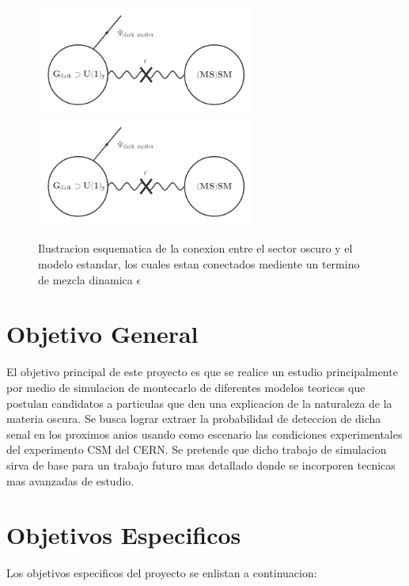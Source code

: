 \begin{figure}
\begin{center}
  \includegraphics[width=2.8in]{sketch_darksector.png}
  \includegraphics[width=2.8in]{sketch_darksector.png}
  \caption{Ilustracion esquematica de la conexion entre el sector oscuro y el modelo estandar, los cuales estan conectados mediente un termino de mezcla dinamica $\epsilon$}
  \label{fig:AMS_positron}
\end{center}
\end{figure}


\chapter{Objetivo General}

El objetivo principal de este proyecto es que se realice un estudio principalmente por medio de simulacion de montecarlo de diferentes modelos teoricos que postulan candidatos a particulas que den una explicacion de la naturaleza de la materia oscura.   Se busca lograr extraer la probabilidad de deteccion de dicha senal en los proximos anios usando como escenario las condiciones experimentales del experimento CSM del CERN.   Se pretende que dicho trabajo de simulacion sirva de base para un trabajo futuro mas detallado donde se incorporen tecnicas mas avanzadas de estudio. 


\chapter{Objetivos Especificos}

Los objetivos especificos del proyecto se enlistan a continuacion: 

